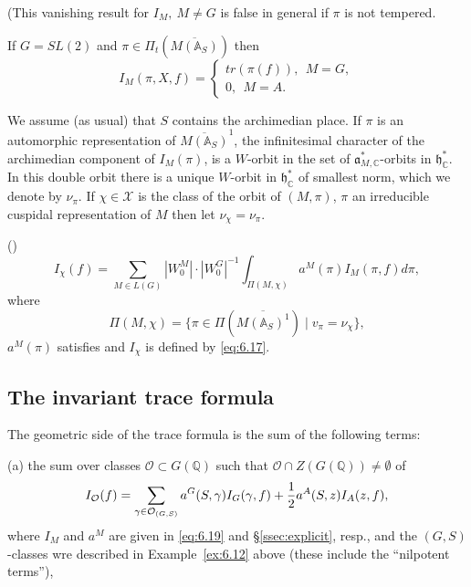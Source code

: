 (This vanishing result for $I_M,\ M\not=G$ is false in
general if $\pi$ is not tempered.

\begin{example}\label{ex:6.21} If $G=SL(2)$ and
$\pi\in\Pi_t(\overline{M({\mathbb{A}}_S)})$ then
\[
I_M(\pi,X,f)=
\left\{
\begin{array}{c}
 tr(\pi(f)),\ \ M=G,\\
 0,\ \ M= A.
\end{array}
\right.
\]
\end{example}

We assume (as usual) that $S$ contains the archimedian place.
If $\pi$ is an automorphic representation of $\overline{M({\mathbb{A}}_S)}^1$,
the infinitesimal character of the archimedian
component of $I_M(\pi)$, is a $W$-orbit in the set of
${\mathfrak{a}}_{M,{\mathbb{C}}}^*$-orbits in ${\mathfrak{h}}_{\mathbb{C}}^*$.
In this double orbit there is a unique
$W$-orbit in ${\mathfrak{h}}_{\mathbb{C}}^*$ of smallest norm, which we denote by
$\nu_\pi$. If $\chi\in {\mathcal{X}}$ is the class of the orbit of
$(M,\pi)$, $\pi$ an
irreducible cuspidal representation of $M$ then let
$\nu_\chi =\nu_\pi$.

\begin{theorem}\label{thm:6.22} (\cite[Corollary 4.5]{A10}) 
\[
I_\chi
(f)
=\sum_{M\in L(G)}|W_0^M|\cdot |W_0^G|^{-1}
\int_{\Pi (M,\chi)}a^M(\pi
)I_M(\pi ,f)d\pi ,
\]
where 
\[
\Pi (M,\chi )=
\{\pi \in \Pi (\overline{M({\mathbb{A}}_S)^1})\;|\;v_\pi =\nu_\chi \},
\]
$a^M(\pi )$ satisfies \cite[(4.5)]{A10} and $I_\chi$ is
defined by \eqref{eq:6.17}.
\end{theorem}

\subsection{The invariant trace formula}

The geometric side of the trace formula is the sum of the following terms:

(a) the sum over classes ${\mathcal{O}}\subset G({\mathbb{Q}})$
such that ${\mathcal{O}}\cap Z(G({\mathbb{Q}}))\not= \emptyset$ of
\begin{equation}\label{eq:6.24}
I_{\mathcal{O}}(f)=\sum_{\gamma\in {\mathcal{O}}_{(G,S)}}
a^G(S,\gamma)I_G(\gamma,f)+{1\over 2}a^A(S,z)I_A(z,f),
\end{equation}
where $I_M$ and $a^M$ are given in \eqref{eq:6.19} and \S\ref{ssec:explicit},
resp., and the $(G,S)$-classes wre described in Example~\ref{ex:6.12}
above (these include the ``nilpotent terms''),

